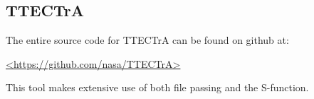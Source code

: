 \documentclass[heading.tex]{subfiles}
\begin{document}
\newpage
\appendix

\subsection{TTECTrA} \label{app:transient} 

The entire source code for TTECTrA can be found on github at:

\url{<https://github.com/nasa/TTECTrA>}

This tool makes extensive use of both file passing and the S-function.


\end{document}

